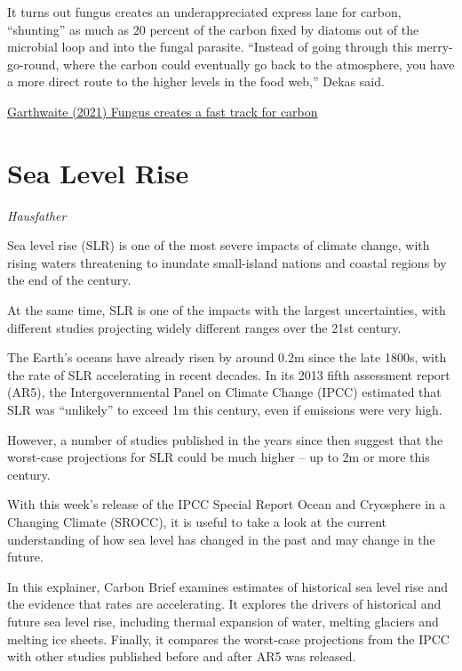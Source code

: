 \documentclass[
]{book}
\begin{document}
It turns out fungus creates an underappreciated express lane for carbon, ``shunting'' as much as 20 percent of the carbon fixed by diatoms out of the microbial loop and into the fungal parasite. ``Instead of going through this merry-go-round, where the carbon could eventually go back to the atmosphere, you have a more direct route to the higher levels in the food web,'' Dekas said.

\href{https://earth.stanford.edu/news/fungus-creates-fast-track-carbon\#gs.5hnti5}{Garthwaite (2021) Fungus creates a fast track for carbon}

\hypertarget{sea-level-rise}{%
\section{Sea Level Rise}\label{sea-level-rise}}

\emph{Hausfather}

Sea level rise (SLR) is one of the most severe impacts of climate change, with rising waters threatening to inundate small-island nations and coastal regions by the end of the century.

At the same time, SLR is one of the impacts with the largest uncertainties, with different studies projecting widely different ranges over the 21st century.

The Earth's oceans have already risen by around 0.2m since the late 1800s, with the rate of SLR accelerating in recent decades. In its 2013 fifth assessment report (AR5), the Intergovernmental Panel on Climate Change (IPCC) estimated that SLR was ``unlikely'' to exceed 1m this century, even if emissions were very high.

However, a number of studies published in the years since then suggest that the worst-case projections for SLR could be much higher -- up to 2m or more this century.

With this week's release of the IPCC Special Report Ocean and Cryosphere in a Changing Climate (SROCC), it is useful to take a look at the current understanding of how sea level has changed in the past and may change in the future.

In this explainer, Carbon Brief examines estimates of historical sea level rise and the evidence that rates are accelerating. It explores the drivers of historical and future sea level rise, including thermal expansion of water, melting glaciers and melting ice sheets. Finally, it compares the worst-case projections from the IPCC with other studies published before and after AR5 was released.
\end{document}
